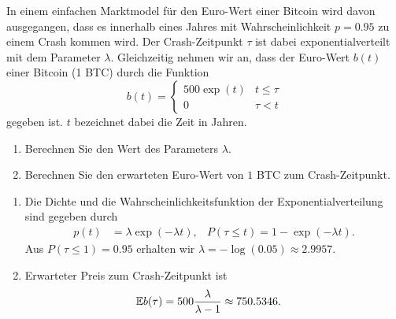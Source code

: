  In einem einfachen Marktmodel für
den Euro-Wert einer Bitcoin wird davon ausgegangen, dass es innerhalb eines
Jahres mit Wahrscheinlichkeit $p=0.95$ zu einem Crash kommen wird. Der
Crash-Zeitpunkt $\tau$ ist dabei exponentialverteilt mit dem Parameter
$\lambda$. Gleichzeitig nehmen wir an, dass der Euro-Wert $b(t)$ einer Bitcoin
(1 BTC) durch die Funktion
\begin{equation*}
    b(t) =
    \begin{cases}
        500 \exp( t ) & t \leq \tau \\
        0 & \tau < t
    \end{cases}
\end{equation*}
gegeben ist. $t$ bezeichnet dabei die Zeit in Jahren. 
\begin{enumerate}
    \item Berechnen Sie den Wert des Parameters $\lambda$.
    \item Berechnen Sie den erwarteten Euro-Wert von $1$ BTC zum Crash-Zeitpunkt.
\end{enumerate}

\solution
\begin{enumerate}
    \item Die Dichte und die Wahrscheinlichkeitsfunktion der Exponentialverteilung sind gegeben 
        durch
        \begin{align*}
            p(t) &= \lambda \exp\left( -\lambda t \right), & P(\tau \leq t) = 1- \exp( - \lambda t). 
        \end{align*}
        Aus $P( \tau \leq 1 ) = 0.95$ erhalten wir $\lambda = - \log\left( 0.05 \right) \approx 2.9957$.
    \item Erwarteter Preis zum Crash-Zeitpunkt ist 
        \begin{align*}
            \mathbb{E} b(\tau) &= 500 \frac{\lambda}{\lambda-1} \approx 750.5346.
        \end{align*}
\end{enumerate}


